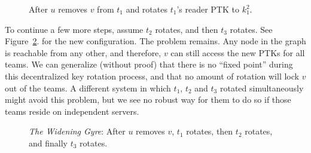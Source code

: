 \begin{figure}[ht]
    \centering
    \caption{After $u$ removes $v$ from $t_1$ and rotates $t_1$'s reader PTK to $k_1^2$.}
    \label{fig:cycle2}
\end{figure}

To continue a few more steps, assume $t_2$ rotates, and then $t_3$ rotates. See Figure~\ref{fig:cycle3}.
for the new configuration. The problem remains. Any node in the graph is reachable from any other,
and therefore, $v$ can still access the new PTKs for all teams. We can generalize (without proof)
that there is no ``fixed point'' during this decentralized key rotation process, and that no amount
of rotation will lock $v$ out of the teams. A different system in which $t_1$, $t_2$ and $t_3$
rotated simultaneously might avoid this problem, but we see no robust way for them to do so 
if those teams reside on independent servers.

\begin{figure}[ht]
    \centering
    \caption{\textit{The Widening Gyre}: After $u$ removes $v$, $t_1$ rotates, then $t_2$ rotates, and finally $t_3$ rotates.}
    \label{fig:cycle3}
\end{figure}


